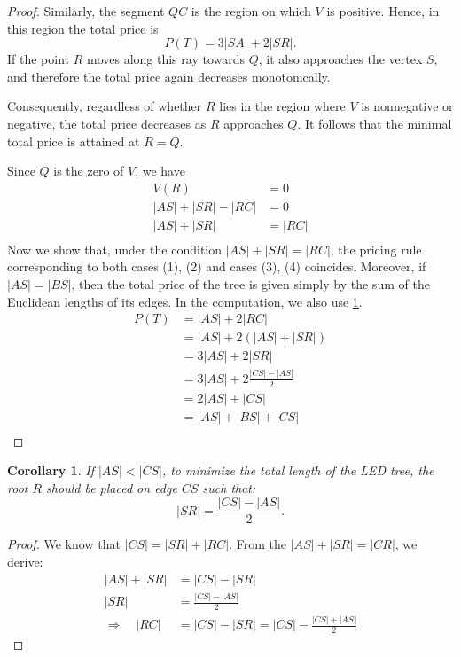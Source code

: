 \documentclass[openany]{book}
\newcommand{\Ptotal}[1]{P(#1)}
\newtheorem{corollary}{Corollary}
\begin{document}
\begin{proof}
		Similarly, the segment \(QC\) is the region on which \(V\) is positive. Hence, in this region  the total price is 
		\[
		\Ptotal{T} = 3|SA| + 2|SR|.
		\]
		If the point \(R\) moves along this ray towards \(Q\), it also approaches
		the vertex \(S\), and therefore the	total price again decreases monotonically.
		
		Consequently, regardless of whether \(R\) lies in the region where \(V\) is
		nonnegative or negative, the total price decreases as \(R\) approaches \(Q\).
		It follows that the minimal total price is attained at \(R = Q\).
		
		Since \(Q\) is the zero of \(V\), we have
		\begin{align*}
		V(R) &= 0 \\
		|AS| + |SR| - |RC| &= 0\\
		|AS| + |SR| &= |RC|\\
		\end{align*}
		Now we show that, under the condition \(|AS| + |SR| = |RC|\), the pricing rule corresponding to both cases (1), (2) and cases (3), (4)
		coincides. Moreover, if \(|AS| = |BS|\), then the total price of the tree is given simply by the sum of the Euclidean lengths of its edges. In the computation, we also use \cref{cor:sr}.
		\begin{align*}
			\Ptotal{T} &= |AS| + 2|RC| \\
			 &= |AS| + 2 (|AS| + |SR|) \\
			 &= 3|AS| + 2|SR| \\ 
			 &= 3|AS| + 2\frac{|CS| - |AS|}{2} \\
			 &= 2|AS| + |CS|\\
			 &= |AS| + |BS| + |CS| \\
		\end{align*}
	\end{proof}
	
	
	\begin{corollary}\label{cor:sr}
	If \(|AS| < |CS|\), to minimize the total length of the LED tree, the root \( R \) should be placed on edge \(CS\) such that:
	  \[
	  |SR| = \frac{|CS| - |AS|}{2}.
	  \]
	\end{corollary}
	\begin{proof}
		We know that \(|CS| = |SR| + |RC|\).
		From the \( |AS|+|SR| = |CR|  \), we derive:
		\begin{align*}
			|AS| + |SR| &= |CS| - |SR| \\
			|SR| &= \frac{|CS| - |AS|}{2} \\
			\Rightarrow \quad |RC| &= |CS| - |SR| = |CS| - \frac{|CS| + |AS|}{2}
		\end{align*}
	\end{proof}
\end{document}
